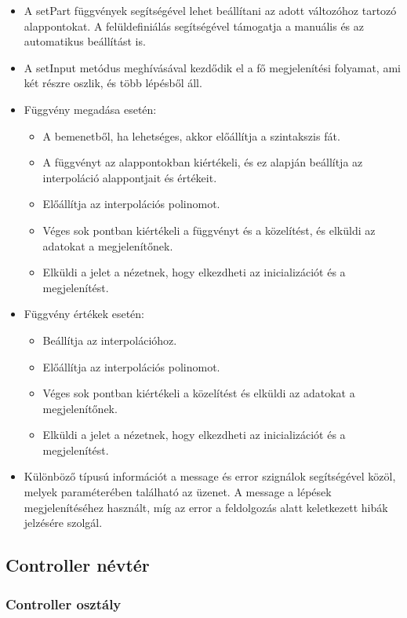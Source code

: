 \documentclass[12pt]{report}
\begin{document}
\begin{itemize}
\item A setPart függvények segítségével lehet beállítani az adott változóhoz tartozó alappontokat. A felüldefiniálás segítségével támogatja a manuális és az automatikus beállítást is.
\item A setInput metódus meghívásával kezdődik el a fő megjelenítési folyamat, ami két részre oszlik, és több lépésből áll.
\item Függvény megadása esetén:
	\begin{itemize}
		\item A bemenetből, ha lehetséges, akkor előállítja a szintakszis fát.
		\item A függvényt az alappontokban kiértékeli, és ez alapján beállítja az interpoláció alappontjait és értékeit.
		\item Előállítja az interpolációs polinomot.
		\item Véges sok pontban kiértékeli a függvényt és a közelítést, és elküldi az adatokat a megjelenítőnek.
		\item Elküldi a jelet a nézetnek, hogy elkezdheti az inicializációt és a megjelenítést.
	\end{itemize}
\item Függvény értékek esetén:
	\begin{itemize}
		\item Beállítja az interpolációhoz.
		\item Előállítja az interpolációs polinomot.
		\item Véges sok pontban kiértékeli a közelítést és elküldi az adatokat a megjelenítőnek.
		\item Elküldi a jelet a nézetnek, hogy elkezdheti az inicializációt és a megjelenítést.
	\end{itemize}
\item Különböző típusú információt a message és error szignálok segítségével közöl, melyek paraméterében található az üzenet. A message a lépések megjelenítéséhez használt, míg az error a feldolgozás alatt keletkezett hibák jelzésére szolgál.
\end{itemize}

\subsection{Controller névtér}
\subsubsection{Controller osztály}
\end{document}
